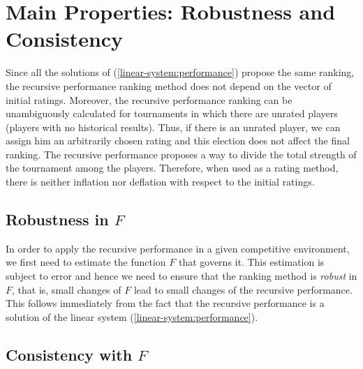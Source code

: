 \documentclass[a4paper,10pt]{article}
\theoremstyle{remark}
\newcommand{\MM}{M} %
\newcommand{\pv}{p} %
\begin{document}
\section{Main Properties:  Robustness and Consistency}
\label{scProperties}

Since all the solutions of (\ref{linear-system:performance}) propose the same ranking, the recursive performance ranking method does not depend on the vector of initial ratings.
Moreover, the recursive performance ranking can be unambiguously
calculated for tournaments in which there are unrated players
(players with no historical results). Thus, if there is an unrated
player, we can assign him an arbitrarily chosen rating and this
election does not affect the final ranking. The recursive
performance proposes a way to divide the total strength of the
tournament among the players. Therefore, when used as a rating
method, there is neither inflation nor deflation with respect to
the initial ratings.


\subsection*{Robustness in $F$}

In order to apply the recursive performance in a given competitive
environment, we first need to estimate the function $F$ that
governs it. This estimation is subject to error and hence we need
to ensure that the ranking method is \emph{robust} in $F$, that
is, small changes of $F$ lead to small changes of the recursive
performance. This follows immediately from the fact that the
recursive performance is a solution of the linear system
(\ref{linear-system:performance}).


\subsection*{Consistency with $F$}
\end{document}
